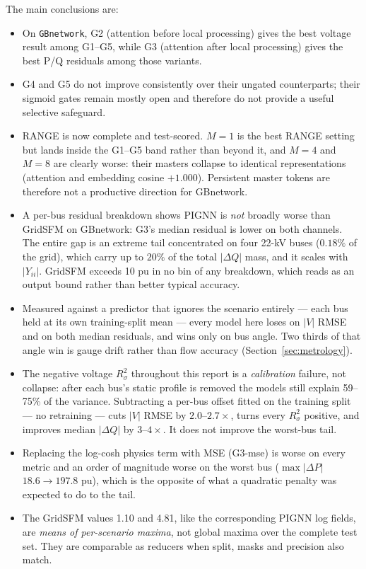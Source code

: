 \documentclass[10pt]{article}
\begin{document}
The main conclusions are:
\begin{itemize}
\item On \texttt{GBnetwork}, G2 (attention before local processing) gives the
      best voltage result among G1--G5, while G3 (attention after local
      processing) gives the best P/Q residuals among those variants.
\item G4 and G5 do not improve consistently over their ungated counterparts;
      their sigmoid gates remain mostly open and therefore do not provide a
      useful selective safeguard.
\item RANGE is now complete and test-scored.  $M=1$ is the best RANGE setting
      but lands inside the G1--G5 band rather than beyond it, and $M=4$ and
      $M=8$ are clearly worse: their masters collapse to identical
      representations (attention and embedding cosine $+1.000$).  Persistent
      master tokens are therefore not a productive direction for GBnetwork.
\item A per-bus residual breakdown shows PIGNN is \emph{not} broadly worse than
      GridSFM on GBnetwork: G3's median residual is lower on both channels.  The
      entire gap is an extreme tail concentrated on four 22-kV buses
      ($0.18\%$ of the grid), which carry up to $20\%$ of the total $|\Delta Q|$
      mass, and it scales with $|Y_{ii}|$.  GridSFM exceeds 10 pu in no bin of
      any breakdown, which reads as an output bound rather than better typical
      accuracy.
\item Measured against a predictor that ignores the scenario entirely --- each
      bus held at its own training-split mean --- every model here loses on
      $|V|$ RMSE and on both median residuals, and wins only on bus angle.  Two
      thirds of that angle win is gauge drift rather than flow accuracy
      (Section~\ref{sec:metrology}).
\item The negative voltage $R^2_{\sigma}$ throughout this report is a
      \emph{calibration}
      failure, not collapse: after each bus's static profile is removed the
      models still explain 59--75\% of the variance.  Subtracting a per-bus
      offset fitted on the training split --- no retraining --- cuts $|V|$ RMSE
      by $2.0$--$2.7\times$, turns every $R^2_{\sigma}$ positive, and improves median
      $|\Delta Q|$ by $3$--$4\times$.  It does not improve the worst-bus tail.
\item Replacing the log-cosh physics term with MSE (G3-mse) is worse on every
      metric and an order of magnitude worse on the worst bus
      ($\max|\Delta P|$ $18.6\to197.8$ pu), which is the opposite of what a
      quadratic penalty was expected to do to the tail.
\item The GridSFM values 1.10 and 4.81, like the corresponding PIGNN log
      fields, are \emph{means of per-scenario maxima}, not global maxima over
      the complete test set.  They are comparable as reducers when split,
      masks and precision also match.
\end{itemize}
\end{document}
